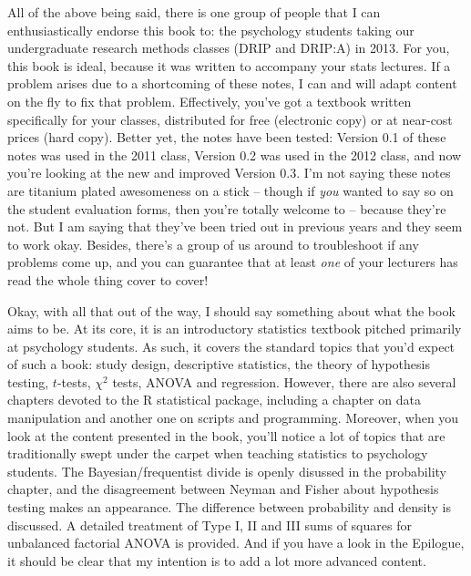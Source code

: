 \documentclass[
]{book}
\begin{document}
All of the above being said, there is one group of people that I can enthusiastically endorse this book to: the psychology students taking our undergraduate research methods classes (DRIP and DRIP:A) in 2013. For you, this book is ideal, because it was written to accompany your stats lectures. If a problem arises due to a shortcoming of these notes, I can and will adapt content on the fly to fix that problem. Effectively, you've got a textbook written specifically for your classes, distributed for free (electronic copy) or at near-cost prices (hard copy). Better yet, the notes have been tested: Version 0.1 of these notes was used in the 2011 class, Version 0.2 was used in the 2012 class, and now you're looking at the new and improved Version 0.3. I'm not saying these notes are titanium plated awesomeness on a stick -- though if \emph{you} wanted to say so on the student evaluation forms, then you're totally welcome to -- because they're not. But I am saying that they've been tried out in previous years and they seem to work okay. Besides, there's a group of us around to troubleshoot if any problems come up, and you can guarantee that at least \emph{one} of your lecturers has read the whole thing cover to cover!

Okay, with all that out of the way, I should say something about what the book aims to be. At its core, it is an introductory statistics textbook pitched primarily at psychology students. As such, it covers the standard topics that you'd expect of such a book: study design, descriptive statistics, the theory of hypothesis testing, \(t\)-tests, \(\chi^2\) tests, ANOVA and regression. However, there are also several chapters devoted to the R statistical package, including a chapter on data manipulation and another one on scripts and programming. Moreover, when you look at the content presented in the book, you'll notice a lot of topics that are traditionally swept under the carpet when teaching statistics to psychology students. The Bayesian/frequentist divide is openly disussed in the probability chapter, and the disagreement between Neyman and Fisher about hypothesis testing makes an appearance. The difference between probability and density is discussed. A detailed treatment of Type I, II and III sums of squares for unbalanced factorial ANOVA is provided. And if you have a look in the Epilogue, it should be clear that my intention is to add a lot more advanced content.
\end{document}
